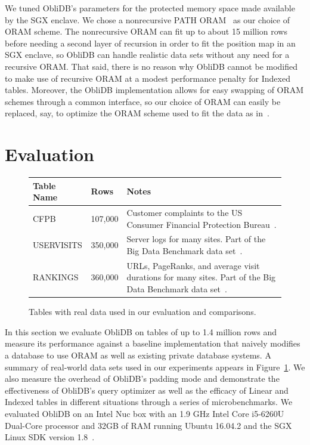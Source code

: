 \documentclass[letterpaper,twocolumn,10pt]{article}
\def\name/{ObliDB}
\begin{document}
We tuned ObliDB's parameters for the protected memory space made available by the SGX enclave. We chose a nonrecursive PATH ORAM~\cite{SDS+13} as our choice of ORAM scheme. The nonrecursive ORAM can fit up to about 15 million rows before needing a second layer of recursion in order to fit the position map in an SGX enclave, so \name/ can handle realistic data sets without any need for a recursive ORAM. That said, there is no reason why \name/ cannot be modified to make use of recursive ORAM at a modest performance penalty for Indexed tables. Moreover, the \name/ implementation allows for easy swapping of ORAM schemes through a common interface, so our choice of ORAM can easily be replaced, say, to optimize the ORAM scheme used to fit the data as in~\cite{ZWR+16}.

\section{Evaluation}\label{eval}
\begin{figure}
\small
\centering
\begin{tabular}{llp{3.1cm}}
\textbf{Table Name} & \textbf{Rows} & \textbf{Notes} \\\hline\rule{0pt}{2ex}
CFPB & 107,000 & Customer complaints to the US Consumer Financial Protection Bureau~\cite{CFPB}.\\
USERVISITS & 350,000 & Server logs for many sites. Part of the Big Data Benchmark data set~\cite{BDB}.\\
RANKINGS & 360,000 & URLs, PageRanks, and average visit durations for many sites. Part of the Big Data Benchmark data set~\cite{BDB}.\\
\end{tabular}
\caption{Tables with real data used in our evaluation and comparisons.}
\label{tabletable}
\end{figure}
In this section we evaluate \name/ on tables of up to 1.4 million rows and measure its performance against a baseline implementation that naively modifies a database to use ORAM as well as existing private database systems. A summary of real-world data sets used in our experiments appears in Figure~\ref{tabletable}. We also measure the overhead of \name/'s padding mode and  demonstrate the effectiveness of \name/'s query optimizer as well as the efficacy of Linear and Indexed tables in different situations through a series of microbenchmarks. We evaluated \name/ on an Intel Nuc box with an 1.9 GHz Intel Core i5-6260U Dual-Core processor and 32GB of RAM running Ubuntu 16.04.2 and the SGX Linux SDK version 1.8~\cite{SGXRef}.
\end{document}

